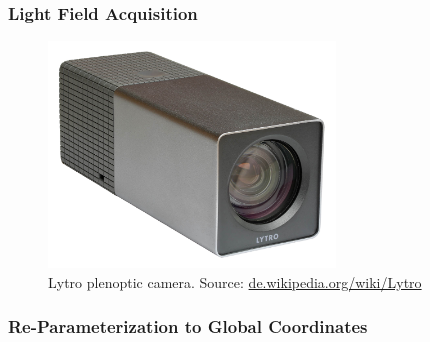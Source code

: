 \documentclass[12pt, compress]{beamer}
\begin{document}
\begin{frame}[fragile]
	\frametitle{Light Field Acquisition}
	
	\begin{figure}
		\includegraphics[height = 6cm]{images/Lytro_Light_Field_Camera-front_background_removed.png}
		\caption*{Lytro plenoptic camera. Source: \href{https://de.wikipedia.org/wiki/Lytro}{de.wikipedia.org/wiki/Lytro}}
	\end{figure}
	
\end{frame}

\begin{frame}[fragile]
	\frametitle{Re-Parameterization to Global Coordinates}
	
	\begin{center}
	\end{center}
\end{frame}
\end{document}
